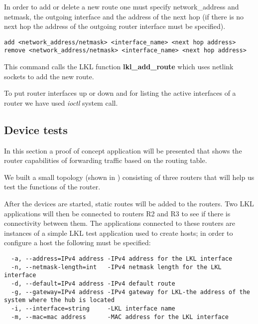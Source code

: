 {{%
In order to add or delete a new route one must specify network_address and netmask, the outgoing interface and 
the address of the next hop (if there is no next hop the address of the outgoing router interface must be specified).
\lstset{language=TeX,caption=Adding a new interface,label=lst:saddrule}
\begin{lstlisting}
add <network_address/netmask> <interface_name> <next hop address>
remove <network_address/netmask> <interface_name> <next hop address>
\end{lstlisting}  
This command calls the LKL function {\bf lkl_add_route} which uses netlink sockets to add the new route.

To put router interfaces up or down and for listing the active interfaces of a router we have used \textit{ioctl} system call.

\subsection{Device tests}
\label{sub-sec:router-tests}

In this section a proof of concept application will be presented that shows the router capabilities of 
forwarding traffic based on the routing table. 

We built a small topology (shown in ) consisting of three routers that will help us test the functions of the router.

After the devices are started, static routes will be added to the routers. Two LKL applications will 
then be connected to routers R2 and R3 to see if there is connectivity between them. The applications 
connected to these routers are instances of a simple LKL test application used to create hosts; in order 
to configure a host the following must be specified:

\begin{lstlisting}
  -a, --address=IPv4 address -IPv4 address for the LKL interface
  -n, --netmask-length=int   -IPv4 netmask length for the LKL interface
  -d, --default=IPv4 address -IPv4 default route
  -g, --gateway=IPv4 address -IPv4 gateway for LKL-the address of the system where the hub is located
  -i, --interface=string     -LKL interface name
  -m, --mac=mac address      -MAC address for the LKL interface
\end{lstlisting}

}}
